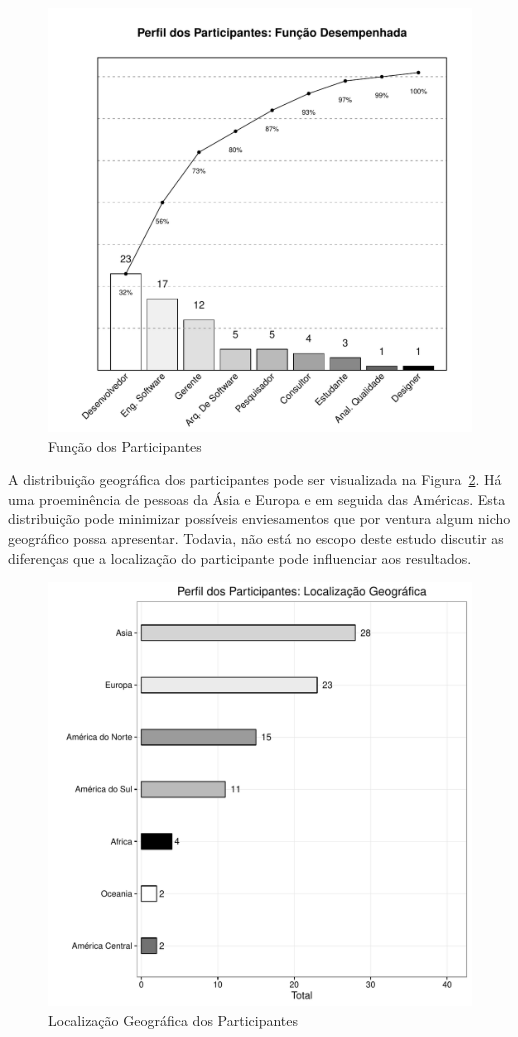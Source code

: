 \begin{figure}[htpb]
	\centering
	\includegraphics[width=0.6\linewidth]{./chapter-pesquisa-com-profissionais/img/grafico_melhoria_fgrm_funcao_participantes.pdf}
	\caption{Função dos Participantes}
\label{fig:grafico_melhorias_fgrm_funcao_particantes}
\end{figure}

A distribuição geográfica dos participantes pode ser visualizada na
Figura~\ref{fig:grafico_melhorias_fgrm_localizacao_geografica}. Há uma
proeminência de pessoas da Ásia e Europa e em seguida das Américas. Esta
distribuição pode minimizar possíveis enviesamentos que por ventura algum nicho
geográfico possa apresentar. Todavia, não está no escopo deste estudo discutir
as diferenças que a localização do participante pode influenciar aos resultados.

\begin{figure}[htpb]
	\centering
	\includegraphics[width=0.6\linewidth]{./chapter-pesquisa-com-profissionais/img/grafico_melhorias_fgrm_localizacao_geografica.pdf}
	\caption{Localização Geográfica dos Participantes}
\label{fig:grafico_melhorias_fgrm_localizacao_geografica}
\end{figure}

